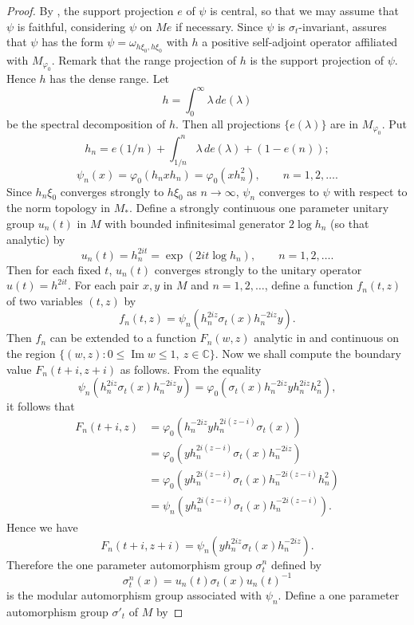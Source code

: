 \documentclass[12pt,b5paper,twoside]{article}
\theoremstyle{takesaki}
\numberwithin{equation}{section}
\begin{document}
\begin{proof}
By , the support projection $e$ of $\psi$ is central, so
that we may assume that $\psi$ is faithful, considering $\psi$ on $Me$
if necessary.  Since $\psi$ is $\sigma_t$-invariant,
 assures that $\psi$ has the form
$\psi=\omega_{h\xi_0,h\xi_0}$ with $h$ a positive self-adjoint operator
affiliated with $M_{\varphi_0}$.  Remark that the range projection of
$h$ is the support projection of $\psi$.  Hence $h$ has the dense range.
Let
\[
  h=\int_0^\infty\lambda\,de(\lambda)
\]
be the spectral decomposition of $h$.  Then all projections
$\{e(\lambda)\}$ are in $M_{\varphi_0}$.  Put
\[
  h_n=e(1/n)+\int_{1/n}^n\lambda\,de(\lambda)+(1-e(n));
\]
\[
  \psi_n(x)=\varphi_0(h_nxh_n)=\varphi_0(xh_n^2),
  \qquad n=1,2,\ldots.
\]
Since $h_n\xi_0$ converges strongly to $h\xi_0$ as $n\to\infty$,
$\psi_n$ converges to $\psi$ with respect to the norm topology in
$M_*$.  Define a strongly continuous one parameter unitary group
$u_n(t)$ in $M$ with bounded infinitesimal generator $2\log h_n$ (so
that analytic) by
\[
  u_n(t)=h_n^{2it}=\exp(2it\log h_n),
  \qquad n=1,2,\ldots.
\]
Then for each fixed $t$, $u_n(t)$ converges strongly to the unitary
operator $u(t)=h^{2it}$.  For each pair $x,y$ in $M$ and
$n=1,2,\ldots$, define a function $f_n(t,z)$ of two variables $(t,z)$
by
\[
  f_n(t,z)=\psi_n(h_n^{2iz}\sigma_t(x)h_n^{-2iz}y).
\]
Then $f_n$ can be extended to a function $F_n(w,z)$ analytic in and
continuous on the region
$\{(w,z):0\leq\operatorname{Im}w\leq1,\ z\in\mathbb C\}$.  Now we shall
compute the boundary value $F_n(t+i,z+i)$ as follows.  From the equality
\[
  \psi_n(h_n^{2iz}\sigma_t(x)h_n^{-2iz}y)
  =\varphi_0(\sigma_t(x)h_n^{-2iz}yh_n^{2iz}h_n^2),
\]
it follows that
\begin{align*}
  F_n(t+i,z)
    &=\varphi_0(h_n^{-2iz}yh_n^{2i(z-i)}\sigma_t(x))\\
    &=\varphi_0(yh_n^{2i(z-i)}\sigma_t(x)h_n^{-2iz})\\
    &=\varphi_0(yh_n^{2i(z-i)}\sigma_t(x)h_n^{-2i(z-i)}h_n^2)\\
    &=\psi_n(yh_n^{2i(z-i)}\sigma_t(x)h_n^{-2i(z-i)}).
\end{align*}
Hence we have
\[
  F_n(t+i,z+i)=\psi_n(yh_n^{2iz}\sigma_t(x)h_n^{-2iz}).
\]
Therefore the one parameter automorphism group $\sigma_t^n$ defined by
\[
  \sigma_t^n(x)=u_n(t)\sigma_t(x)u_n(t)^{-1}
\]
is the modular automorphism group associated with $\psi_n$.  Define a
one parameter automorphism group $\sigma'_t$ of $M$ by

\end{proof}
\end{document}
